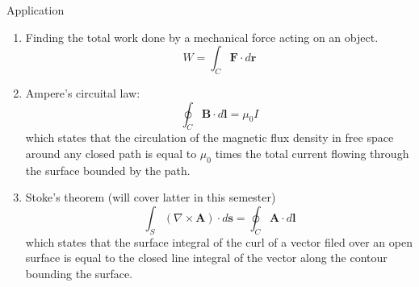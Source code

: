 \documentclass[10pt]{beamer}
\begin{document}
\begin{frame}[allowframebreaks]{Application}
\begin{enumerate}
	\item Finding the total work done by a mechanical force acting on an object.
	$$W = \int_C \mathbf{F}\cdot d\mathbf{r}$$
	\item {\color{blue}Ampere's circuital law}:
	$$\oint_C \mathbf{B}\cdot d\mathbf{l} = \mu_0 I$$
	which states that the circulation of the magnetic flux density in free space around any closed path is equal to $\mu_0$ times the total current flowing through the surface bounded by the path.
	\item {\color{blue}Stoke's theorem} (will cover latter in this semester)
	$$\int_S(\nabla\times\mathbf{A})\cdot d\mathbf{s} = \oint_C \mathbf{A}\cdot d\mathbf{l}$$
	which states that the surface integral of the curl of a vector filed over an open surface is equal to the {\color{red}closed line integral} of the vector along the contour bounding the surface.
\end{enumerate}
	
\end{frame}
\end{document}
